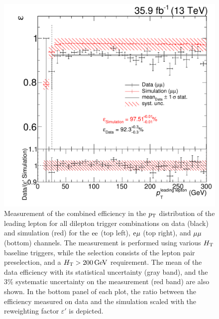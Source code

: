 \begin{figure}[htb]
 \includegraphics[width=\pairwidth]{figures/triggerStudies/efficiency_dataHT_trigDilep_MM_pt1}
 \caption{Measurement of the combined efficiency in the $p_{\mathrm{T}}$ distribution of the leading lepton for all dilepton trigger combinations on data (black) and simulation (red) for the $\mathrm{e}\mathrm{e}$ (top left), $\mathrm{e}\mu$ (top right), and $\mu\mu$ (bottom) channels. The measurement is performed using various $H_{\mathrm{T}}$ baseline triggers, while the selection consists of the lepton pair preselection, and a $H_{\mathrm{T}}>200\,\text{Ge\hspace{-.08em}V}$ requirement. The mean of the data efficiency with its statistical uncertainty (gray band), and the $3\%$ systematic uncertainty on the measurement (red band) are also shown. In the bottom panel of each plot, the ratio between the efficiency measured on data and the simulation scaled with the reweighting factor $\varepsilon'$ is depicted.}
 \label{fig:app_triggEff}
\end{figure}

